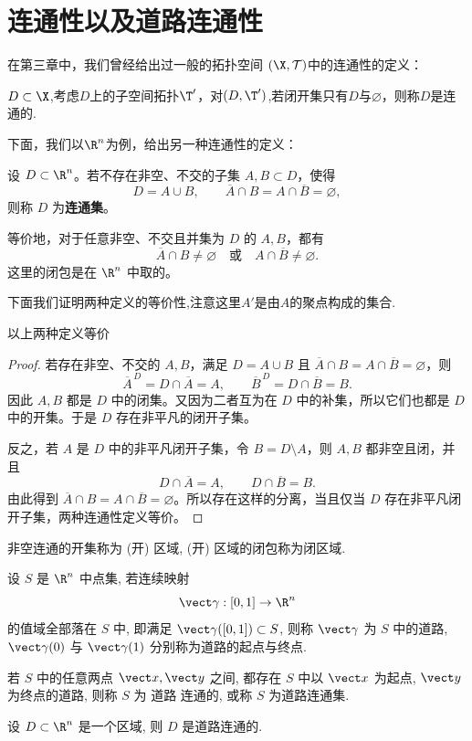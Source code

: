 \section{连通性以及道路连通性}
在第三章中，我们曾经给出过一般的拓扑空间 $(\X,\mathcal T)$中的连通性的定义：

$D\subset \X$,考虑$D$上的子空间拓扑$\T'$，对$(D,\T')$,若闭开集只有$D\text{与}\varnothing$，则称$D$是连通的.

下面，我们以$\R^n$为例，给出另一种连通性的定义：


\begin{definition}
设 $D\subset\R^n$。若不存在非空、不交的子集 $A,B\subset D$，使得
\[
D=A\cup B,\qquad
\overline A\cap B=A\cap\overline B=\varnothing,
\]
则称 $D$ 为\textbf{连通集}。

等价地，对于任意非空、不交且并集为 $D$ 的 $A,B$，都有
\[
\overline A\cap B\neq\varnothing
\quad\text{或}\quad A\cap\overline B\neq\varnothing.
\]
这里的闭包是在 $\R^n$ 中取的。
\end{definition}
下面我们证明两种定义的等价性,注意这里$A'$是由$A$的聚点构成的集合.
\begin{proposition}
	以上两种定义等价
\end{proposition}
\begin{proof}
若存在非空、不交的 $A,B$，满足 $D=A\cup B$ 且 $\overline A\cap B=A\cap\overline B=\varnothing$，则
\[
\overline A^{\,D}=D\cap\overline A=A,\qquad
\overline B^{\,D}=D\cap\overline B=B.
\]
因此 $A,B$ 都是 $D$ 中的闭集。又因为二者互为在 $D$ 中的补集，所以它们也都是 $D$ 中的开集。于是 $D$ 存在非平凡的闭开子集。

反之，若 $A$ 是 $D$ 中的非平凡闭开子集，令 $B=D\setminus A$，则 $A,B$ 都非空且闭，并且
\[
D\cap\overline A=A,\qquad D\cap\overline B=B.
\]
由此得到 $\overline A\cap B=A\cap\overline B=\varnothing$。所以存在这样的分离，当且仅当 $D$ 存在非平凡闭开子集，两种连通性定义等价。
\end{proof}
\begin{definition}
	非空连通的开集称为 (开) 区域, (开) 区域的闭包称为闭区域.
\end{definition}
\begin{definition}
	设 $S$ 是 $\R^n$ 中点集, 若连续映射
	\[
	\vect\gamma: [0, 1] \to \R^n
	\]
	的值域全部落在 $S$ 中, 即满足 $\vect\gamma([0, 1]) \subset S$, 则称 $\vect\gamma$ 为 $S$ 中的道路, $\vect\gamma(0)$ 与 $\vect\gamma(1)$ 分别称为道路的起点与终点.
	
	若 $S$ 中的任意两点 $\vect x, \vect y$ 之间, 都存在 $S$ 中以 $\vect x$ 为起点, $\vect y$ 为终点的道路, 则称 $S$ 为 道路 连通的, 或称 $S$ 为道路连通集.
\end{definition}
\begin{proposition}[$\R^n$ 中的区域是道路连通的]
	设 $D\subset\R^n$ 是一个区域, 则 $D$ 是道路连通的.
\end{proposition}

